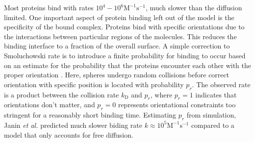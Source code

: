 \documentclass[../talant.diss.submit.tex]{subfiles}
\begin{document}
Most proteins bind with rates $10^{4}-10^{6} \mathrm{M}^{-1}\mathrm{s}^{-1}$,
much slower than the diffusion limited. One important aspect of protein binding
left out of the model is the specificity of the bound complex.  Proteins bind
with specific orientations due to the interactions between particular
regions of the molecules. This reduces the binding interface to a fraction of
the overall surface. A simple correction to Smoluchowski rate is to introduce a
finite probability for binding to occur based on an estimate for the probability
that the proteins encounter each other with the proper orientation
\cite{janin:97}.  Here, spheres undergo random collisions before correct
orientation with specific position is located with probability $p_r$. The
observed rate is a product between the collision rate $k_{\mathrm{D}}$ and
$p_r$, where $p_r=1$ indicates that orientations don't matter, and $p_r=0$
represents orientational constraints too stringent for a reasonably short
binding time.  Estimating $p_r$ from simulation, Janin \textit{et al.} predicted
much slower biding rate $k \approx 10^{5}\mathrm{M}^{-1}\mathrm{s}^{-1}$
compared to a model that only accounts for free diffusion\cite{janin:97}.
\end{document}
